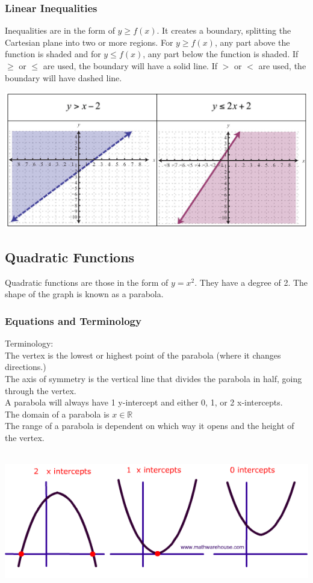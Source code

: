 \documentclass[11pt, fleqn]{article}
\begin{document}
\subsubsection{Linear Inequalities}
Inequalities are in the form of $y\geq f(x)$. It creates a boundary, splitting the Cartesian plane into two or more regions. For $y\geq f(x)$, any part above the function is shaded and for $y\leq f(x)$, any part below the function is shaded. If $\geq$ or $\leq$ are used, the boundary will have a solid line. If $>$ or $<$ are used, the boundary will have dashed line.\\
\centerline{\includegraphics[scale = 0.3]{PreCalcPictures/LinearInequalities.jpg}}








\subsection{Quadratic Functions}
Quadratic functions are those in the form of $y=x^2$. They have a degree of 2. The shape of the graph is known as a parabola.

\subsubsection{Equations and Terminology}
Terminology:\\
The vertex is the lowest or highest point of the parabola (where it changes directions.)\\
The axis of symmetry is the vertical line that divides the parabola in half, going through the vertex.\\
A parabola will always have 1 y-intercept and either 0, 1, or 2 x-intercepts.\\
The domain of a parabola is $x\in\mathbb{R}$\\
The range of a parabola is dependent on which way it opens and the height of the vertex.\\
\\
\centerline{\includegraphics[scale = 0.6]{PreCalcPictures/ParabolaSolutions.png}}
\end{document}
